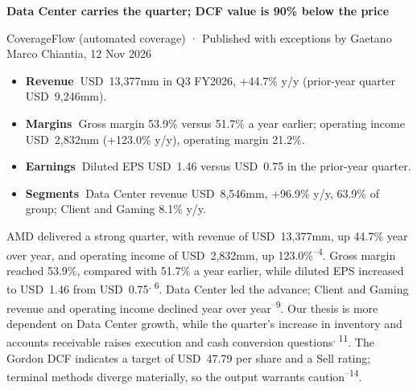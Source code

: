 \documentclass[10pt,a4paper]{article}
\newcommand{\hrl}[3]{\par\nointerlineskip\vspace{#1}\noindent{\color{#2}\rule{\linewidth}{#3}}\par\nointerlineskip}
\newcommand{\sech}[1]{\par\vspace{10pt}\noindent{\sffamily\fontsize{7.5}{9}\selectfont\bfseries\color{accent}\textls[90]{\MakeUppercase{#1}}}\hrl{2pt}{accent}{0.6pt}\vspace{4pt}}
\renewcommand{\cite}[1]{\textsuperscript{\sffamily\color{accent}\fontsize{6.2}{6}\selectfont #1}}
\begin{document}
\thispagestyle{fancy}
\newlength{\sidew}\setlength{\sidew}{60mm}
\newlength{\gapw}\setlength{\gapw}{5.5mm}
\newlength{\mainw}\setlength{\mainw}{\dimexpr\textwidth-\sidew-2\gapw-0.4pt\relax}
\newlength{\colh}\setlength{\colh}{229mm}

\noindent
\begin{minipage}[t][\colh][t]{\mainw}
\RaggedRight
{\sffamily\fontsize{8}{10}\selectfont\bfseries\color{accent}}\par
\vspace{3pt}
{\sffamily\fontsize{18.5}{21.5}\selectfont\bfseries\color{ink}Data Center carries the quarter; DCF value is 90\% below the price\par}
\vspace{5pt}
{\sffamily\fontsize{7.5}{9.5}\selectfont\color{mute}CoverageFlow (automated coverage) · Published with exceptions by Gaetano Marco Chiantia, 12 Nov 2026\par}
\hrl{3pt}{hair}{0.4pt}

\vspace{7pt}
\begin{itemize}[leftmargin=10pt,labelwidth=6pt,labelsep=4pt,itemsep=3pt,parsep=0pt,topsep=0pt,
  label={\raisebox{0.25ex}{\rule{3.2pt}{3.2pt}}}]
\item {\sffamily\fontsize{9}{11.5}\selectfont\bfseries\color{accent}Revenue\ }{\fontsize{10}{12.6}\selectfont USD~13,377mm in Q3 FY2026, +44.7\% y/y (prior-year quarter USD~9,246mm).}
\item {\sffamily\fontsize{9}{11.5}\selectfont\bfseries\color{accent}Margins\ }{\fontsize{10}{12.6}\selectfont Gross margin 53.9\% versus 51.7\% a year earlier; operating income USD~2,832mm (+123.0\% y/y), operating margin 21.2\%.}
\item {\sffamily\fontsize{9}{11.5}\selectfont\bfseries\color{accent}Earnings\ }{\fontsize{10}{12.6}\selectfont Diluted EPS USD~1.46 versus USD~0.75 in the prior-year quarter.}
\item {\sffamily\fontsize{9}{11.5}\selectfont\bfseries\color{accent}Segments\ }{\fontsize{10}{12.6}\selectfont Data Center revenue USD~8,546mm, +96.9\% y/y, 63.9\% of group; Client and Gaming \textminus{}8.1\% y/y.}
\end{itemize}

\sech{Summary}
\fontsize{10}{13}\selectfont
AMD delivered a strong quarter, with revenue of USD~13,377mm, up 44.7\% year over year, and operating income of USD~2,832mm, up 123.0\%\cite{1--4}. Gross margin reached 53.9\%, compared with 51.7\% a year earlier, while diluted EPS increased to USD~1.46 from USD~0.75\cite{5, 6}. Data Center led the advance; Client and Gaming revenue and operating income declined year over year\cite{7--9}. Our thesis is more dependent on Data Center growth, while the quarter’s increase in inventory and accounts receivable raises execution and cash conversion questions\cite{10, 11}. The Gordon DCF indicates a target of USD~47.79 per share and a Sell rating; terminal methods diverge materially, so the output warrants caution\cite{12--14}.


\end{minipage}
\end{document}
